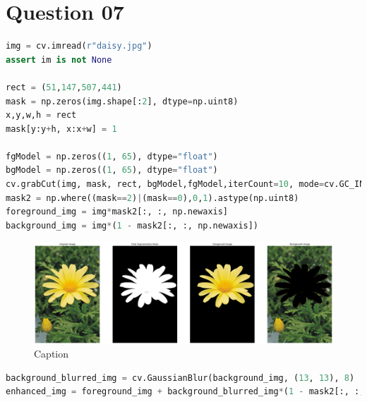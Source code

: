 \documentclass[a4paper]{article}
\begin{document}
\section*{Question 07}
\begin{lstlisting}[language=python]
img = cv.imread(r"daisy.jpg")
assert im is not None

rect = (51,147,507,441)
mask = np.zeros(img.shape[:2], dtype=np.uint8)
x,y,w,h = rect
mask[y:y+h, x:x+w] = 1 

fgModel = np.zeros((1, 65), dtype="float")
bgModel = np.zeros((1, 65), dtype="float")
cv.grabCut(img, mask, rect, bgModel,fgModel,iterCount=10, mode=cv.GC_INIT_WITH_RECT)
mask2 = np.where((mask==2)|(mask==0),0,1).astype(np.uint8)
foreground_img = img*mask2[:, :, np.newaxis] 
background_img = img*(1 - mask2[:, :, np.newaxis])
\end{lstlisting}
\begin{figure}[!htb]
    \centering
    \hspace*{-1cm}
    \includegraphics[width=1.1\textwidth]{../q7.png}
    \caption{Caption}
    \label{fig:my_label}
\end{figure}

\begin{lstlisting}[language=python]
background_blurred_img = cv.GaussianBlur(background_img, (13, 13), 8)
enhanced_img = foreground_img + background_blurred_img*(1 - mask2[:, :, np.newaxis])
\end{lstlisting}
\end{document}

